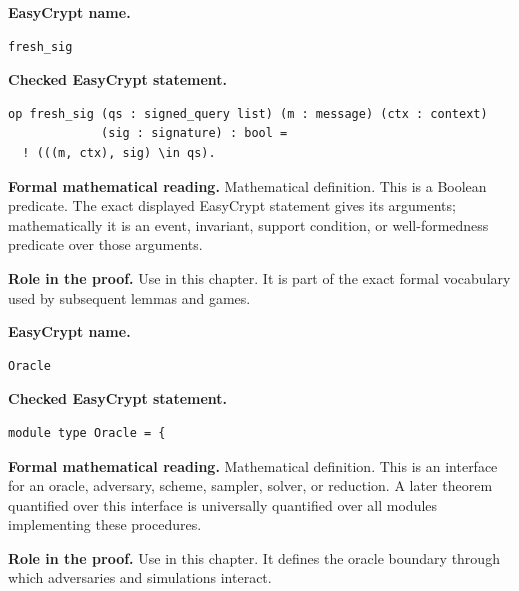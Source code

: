 \begin{formaldefinition}
\noindent\textbf{EasyCrypt name.}
\begin{lstlisting}[language=EasyCrypt,basicstyle=\ttfamily\scriptsize]
fresh_sig
\end{lstlisting}
\noindent\textbf{Checked EasyCrypt statement.}
\begin{lstlisting}[language=EasyCrypt,basicstyle=\ttfamily\scriptsize]
op fresh_sig (qs : signed_query list) (m : message) (ctx : context)
             (sig : signature) : bool =
  ! (((m, ctx), sig) \in qs).
\end{lstlisting}
\noindent\textbf{Formal mathematical reading.}
Mathematical definition. This is a Boolean predicate.  The exact displayed EasyCrypt statement gives its arguments; mathematically it is an event, invariant, support condition, or well-formedness predicate over those arguments.

\noindent\textbf{Role in the proof.}
Use in this chapter. It is part of the exact formal vocabulary used by subsequent lemmas and games.

\end{formaldefinition}

\begin{formaldefinition}
\noindent\textbf{EasyCrypt name.}
\begin{lstlisting}[language=EasyCrypt,basicstyle=\ttfamily\scriptsize]
Oracle
\end{lstlisting}
\noindent\textbf{Checked EasyCrypt statement.}
\begin{lstlisting}[language=EasyCrypt,basicstyle=\ttfamily\scriptsize]
module type Oracle = {
\end{lstlisting}
\noindent\textbf{Formal mathematical reading.}
Mathematical definition. This is an interface for an oracle, adversary, scheme, sampler, solver, or reduction.  A later theorem quantified over this interface is universally quantified over all modules implementing these procedures.

\noindent\textbf{Role in the proof.}
Use in this chapter. It defines the oracle boundary through which adversaries and simulations interact.

\end{formaldefinition}

